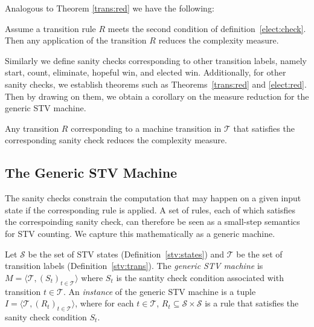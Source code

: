 \documentclass{llncs}
\begin{document}
\noindent
Analogous to Theorem \ref{trans:red} we have the following:
\begin{theorem}\label{elect:red}
Assume a transition rule $R$ meets the second condition of definition~\ref{elect:check}. Then any application of the transition $R$ reduces the complexity measure.
\end{theorem}

\noindent
Similarly we define sanity checks corresponding to other transition
labels, namely start, count, eliminate, hopeful win, and elected
win. Additionally, for other sanity checks, we establish theorems
such as Theorems~\ref{trans:red} and \ref{elect:red}. Then by drawing on them, we obtain
a corollary on the measure reduction for the generic STV machine.
\begin{corollary}\label{measure:reduction}
Any transition $R$ corresponding to a machine transition in
$\mathcal{T}$ that satisfies the corresponding sanity check reduces the complexity measure.
\end{corollary}  



\subsection{The Generic STV Machine} 
The sanity checks constrain the computation that may happen on a
given input state if the corresponding rule is applied. A set of
rules, each of which satisfies the correspoinding sanity check, can
therefore be seen as a small-step semantics for STV counting. We
capture this mathematically as a generic machine.

\begin{definition}
Let $\mathcal{S}$ be the set of STV states
(Definition~\ref{stv:states})  and $\mathcal{T}$ be the set of
transition labels (Definition~\ref{stv:trans}). The \emph{generic
STV machine} is $M = \langle \mathcal{T}, (S_t)_{t \in \mathcal{T}}
\rangle$ where $S_t$ is the santity check condition associated with
transition $t \in \mathcal{T}$. An \emph{instance} of the generic
STV machine is a tuple $I = \langle \mathcal{T}, (R_t)_{t \in
\mathcal{T}} \rangle$, where for each $t \in \mathcal{T}$, $R_t
\subseteq \mathcal{S} \times \mathcal{S}$ is a rule that satisfies
the sanity check condition $S_t$. 
\end{definition}
\end{document}
